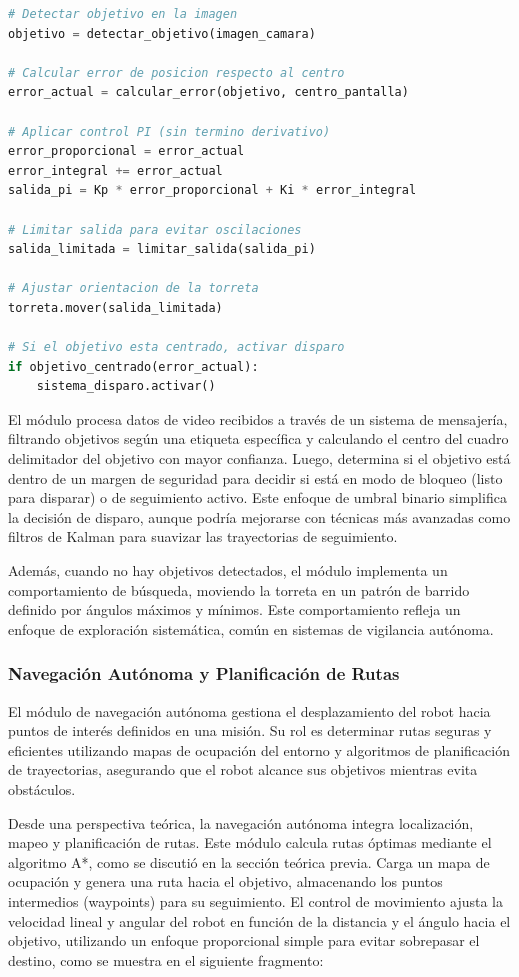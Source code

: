 \begin{lstlisting}[language=Python, caption=Control PI para seguimiento de objetivos, label=lst:control_pi]
# Detectar objetivo en la imagen
objetivo = detectar_objetivo(imagen_camara)

# Calcular error de posicion respecto al centro
error_actual = calcular_error(objetivo, centro_pantalla)

# Aplicar control PI (sin termino derivativo)
error_proporcional = error_actual
error_integral += error_actual
salida_pi = Kp * error_proporcional + Ki * error_integral

# Limitar salida para evitar oscilaciones
salida_limitada = limitar_salida(salida_pi)

# Ajustar orientacion de la torreta
torreta.mover(salida_limitada)

# Si el objetivo esta centrado, activar disparo
if objetivo_centrado(error_actual):
    sistema_disparo.activar()
\end{lstlisting}
El módulo procesa datos de video recibidos a través de un sistema de mensajería, filtrando objetivos según una etiqueta específica y calculando el centro del cuadro delimitador del objetivo con mayor confianza. Luego, determina si el objetivo está dentro de un margen de seguridad para decidir si está en modo de bloqueo (listo para disparar) o de seguimiento activo. Este enfoque de umbral binario simplifica la decisión de disparo, aunque podría mejorarse con técnicas más avanzadas como filtros de Kalman para suavizar las trayectorias de seguimiento.

Además, cuando no hay objetivos detectados, el módulo implementa un comportamiento de búsqueda, moviendo la torreta en un patrón de barrido definido por ángulos máximos y mínimos. Este comportamiento refleja un enfoque de exploración sistemática, común en sistemas de vigilancia autónoma.

\subsubsection{Navegación Autónoma y Planificación de Rutas}

El módulo de navegación autónoma gestiona el desplazamiento del robot hacia puntos de interés definidos en una misión. Su rol es determinar rutas seguras y eficientes utilizando mapas de ocupación del entorno y algoritmos de planificación de trayectorias, asegurando que el robot alcance sus objetivos mientras evita obstáculos.

Desde una perspectiva teórica, la navegación autónoma integra localización, mapeo y planificación de rutas. Este módulo calcula rutas óptimas mediante el algoritmo A*, como se discutió en la sección teórica previa. Carga un mapa de ocupación y genera una ruta hacia el objetivo, almacenando los puntos intermedios (waypoints) para su seguimiento. El control de movimiento ajusta la velocidad lineal y angular del robot en función de la distancia y el ángulo hacia el objetivo, utilizando un enfoque proporcional simple para evitar sobrepasar el destino, como se muestra en el siguiente fragmento:

